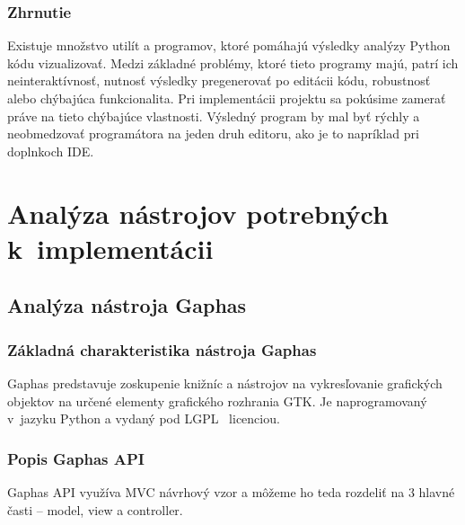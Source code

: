 \documentclass[11pt,oneside,final]{fithesis2}
\begin{document}
	\subsection{Zhrnutie}
	
	Existuje množstvo utilít a programov, ktoré pomáhajú výsledky analýzy Python kódu vizualizovať. Medzi základné problémy, ktoré tieto programy majú, patrí ich neinteraktívnosť, nutnosť výsledky pregenerovať po editácii kódu, robustnosť alebo chýbajúca funkcionalita. Pri implementácii projektu sa pokúsime zamerať práve na tieto chýbajúce vlastnosti. Výsledný program by mal byť rýchly a neobmedzovať programátora na jeden druh editoru, ako je to napríklad pri doplnkoch IDE.
	
    
\chapter{Analýza nástrojov potrebných k~implementácii}

	\section{Analýza nástroja Gaphas}

	\subsection{Základná charakteristika nástroja Gaphas}

		Gaphas predstavuje zoskupenie knižníc a nástrojov na vykresľovanie grafických objektov na určené elementy grafického rozhrania GTK. Je naprogramovaný v~jazyku Python a vydaný pod LGPL~\cite{lgpl} licenciou.

	\subsection{Popis Gaphas API}

Gaphas API využíva MVC návrhový vzor a môžeme ho teda rozdeliť na 3 hlavné časti -- model, view a controller.
\end{document}
